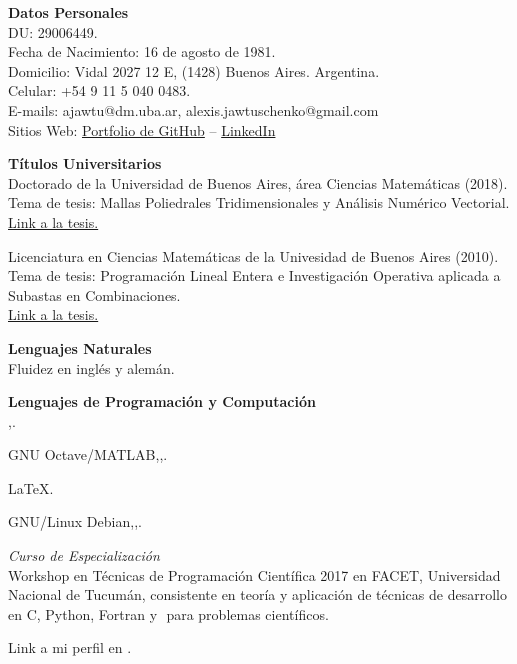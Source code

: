 \textbf{Datos Personales}\\[6pt]
DU: 29006449.\\
Fecha de Nacimiento: 16 de agosto de 1981.\\
Domicilio: Vidal 2027 12 E, (1428) Buenos Aires. Argentina.\\
Celular: +54 9 11 5 040 0483.\\
E-mails: ajawtu@dm.uba.ar, alexis.jawtuschenko@gmail.com\\
Sitios Web: \href{https://github.com/alexisjawtu}{{\color{blue}Portfolio de GitHub}}
-- \href{https://www.linkedin.com/in/alexis-jawtuschenko/}{{\color{blue}LinkedIn}}

\textbf{T\'{i}tulos Universitarios}\\[6pt]
Doctorado de la Universidad de Buenos Aires, \'area Ciencias Matem\'aticas (2018).\\
Tema de tesis: Mallas Poliedrales Tridimensionales y An\'alisis Num\'erico Vectorial.\\
\href{https://cms.dm.uba.ar/academico/carreras/doctorado/thesisJawtuschenko.pdf}
{{\color{blue}Link a la tesis.}}

Licenciatura en Ciencias Matem\'aticas de la Univesidad de Buenos Aires (2010).\\
Tema de tesis: Programaci\'on Lineal Entera e Investigaci\'on Operativa aplicada a
Subastas en Combinaciones.\\
\href{https://cms.dm.uba.ar/academico/carreras/licenciatura/tesis/2010/Jawtuschenko_Alexis.pdf}
{{\color{blue}Link a la tesis.}}

\textbf{Lenguajes Naturales}\\[6pt]
Fluidez en ingl\'es y alem\'an.

\textbf{Lenguajes de Programaci\'on y Computaci\'on}\\[6pt]
\Cpp,\;.

{GNU Octave/MATLAB},\;,\;.

{LaTeX}.

{GNU/Linux Debian},\;,\;.

\emph{Curso de Especializaci\'on}\\
{Workshop en T\'ecnicas de Programaci\'on Cient\'ifica 2017} en FACET, 
Universidad Nacional de Tucum\'an, consistente en teor\'ia y aplicaci\'on de t\'ecnicas 
de desarrollo en C, Python, Fortran y \Cpp\,\,para problemas cient\'ificos.

Link a mi perfil en \href{https://projecteuler.net/profile/alexisj.png}
{\color{blue}{Project Euler}}.

